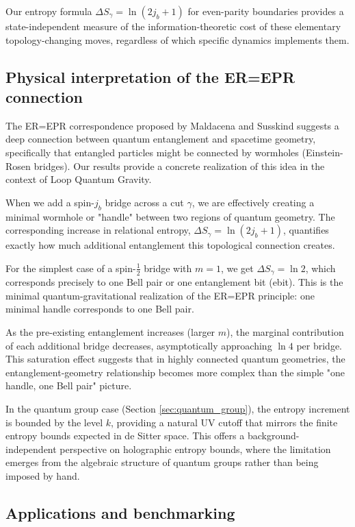 \documentclass[11pt, a4paper]{article}
\theoremstyle{plain}
\theoremstyle{definition}
\theoremstyle{remark}
\begin{document}
Our entropy formula $\Delta S_{\gamma} = \ln(2j_b+1)$ for even-parity boundaries provides a state-independent measure of the information-theoretic cost of these elementary topology-changing moves, regardless of which specific dynamics implements them.

\subsection{Physical interpretation of the ER=EPR connection}
\label{sec:er_epr}

The ER=EPR correspondence proposed by Maldacena and Susskind \cite{MaldacenaSusskind2013} suggests a deep connection between quantum entanglement and spacetime geometry, specifically that entangled particles might be connected by wormholes (Einstein-Rosen bridges). Our results provide a concrete realization of this idea in the context of Loop Quantum Gravity.

When we add a spin-$j_b$ bridge across a cut $\gamma$, we are effectively creating a minimal wormhole or "handle" between two regions of quantum geometry. The corresponding increase in relational entropy, $\Delta S_{\gamma} = \ln(2j_b+1)$, quantifies exactly how much additional entanglement this topological connection creates.

For the simplest case of a spin-$\frac{1}{2}$ bridge with $m=1$, we get $\Delta S_{\gamma} = \ln 2$, which corresponds precisely to one Bell pair or one entanglement bit (ebit). This is the minimal quantum-gravitational realization of the ER=EPR principle: one minimal handle corresponds to one Bell pair.

As the pre-existing entanglement increases (larger $m$), the marginal contribution of each additional bridge decreases, asymptotically approaching $\ln 4$ per bridge. This saturation effect suggests that in highly connected quantum geometries, the entanglement-geometry relationship becomes more complex than the simple "one handle, one Bell pair" picture.

In the quantum group case (Section \ref{sec:quantum_group}), the entropy increment is bounded by the level $k$, providing a natural UV cutoff that mirrors the finite entropy bounds expected in de Sitter space. This offers a background-independent perspective on holographic entropy bounds, where the limitation emerges from the algebraic structure of quantum groups rather than being imposed by hand.

\subsection{Applications and benchmarking}
\label{sec:applications}
\end{document}

